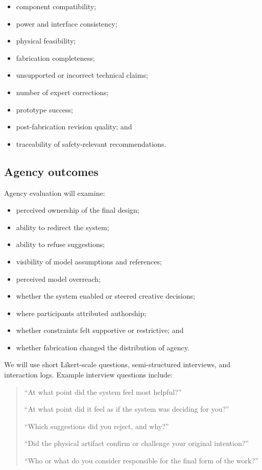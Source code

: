 \documentclass{article}
\begin{document}
\begin{itemize}[leftmargin=*]
    \item component compatibility;
    \item power and interface consistency;
    \item physical feasibility;
    \item fabrication completeness;
    \item unsupported or incorrect technical claims;
    \item number of expert corrections;
    \item prototype success;
    \item post-fabrication revision quality; and
    \item traceability of safety-relevant recommendations.
\end{itemize}

\subsection{Agency outcomes}

Agency evaluation will examine:

\begin{itemize}[leftmargin=*]
    \item perceived ownership of the final design;
    \item ability to redirect the system;
    \item ability to refuse suggestions;
    \item visibility of model assumptions and references;
    \item perceived model overreach;
    \item whether the system enabled or steered creative decisions;
    \item where participants attributed authorship;
    \item whether constraints felt supportive or restrictive; and
    \item whether fabrication changed the distribution of agency.
\end{itemize}

We will use short Likert-scale questions, semi-structured interviews, and
interaction logs. Example interview questions include:

\begin{quote}
``At what point did the system feel most helpful?''

``At what point did it feel as if the system was deciding for you?''

``Which suggestions did you reject, and why?''

``Did the physical artifact confirm or challenge your original intention?''

``Who or what do you consider responsible for the final form of the work?''
\end{quote}
\end{document}

